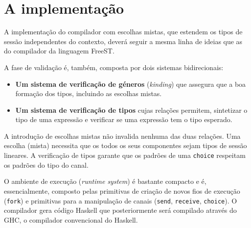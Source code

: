 \section{A implementação}

A implementação do compilador com escolhas mistas, que estendem os tipos de sessão
independentes do contexto, deverá seguir a mesma linha de ideias que as do compilador da linguagem FreeST\cite{2019freest,2019freest-inforum}.

A fase de validação é, também, composta por dois sistemas bidirecionais:
\begin{itemize}
\item \textbf{Um sistema de verificação de géneros} (\textit{kinding}) que assegura que a boa formação dos tipos, incluindo as escolhas mistas.
\item \textbf{Um sistema de verificação de tipos} cujas relações permitem, sintetizar o tipo de uma expressão e verificar se uma expressão tem o tipo esperado. 
\end{itemize}
A introdução de escolhas mistas não invalida nenhuma das duas relações.
Uma escolha (mista) necessita que os todos os seus componentes sejam tipos de sessão lineares. A verificação de tipos garante que os padrões de uma \lstinline|choice| respeitam os padrões do tipo do canal.

O ambiente de execução (\textit{runtime system}) é bastante compacto e é, essencialmente, composto pelas primitivas de criação de novos fios de execução (\lstinline|fork|) e primitivas para a manipulação de canais (\lstinline|send|, \lstinline|receive|, \lstinline|choice|). O compilador gera código Haskell que posteriormente será compilado através do GHC, o compilador convencional do Haskell.

